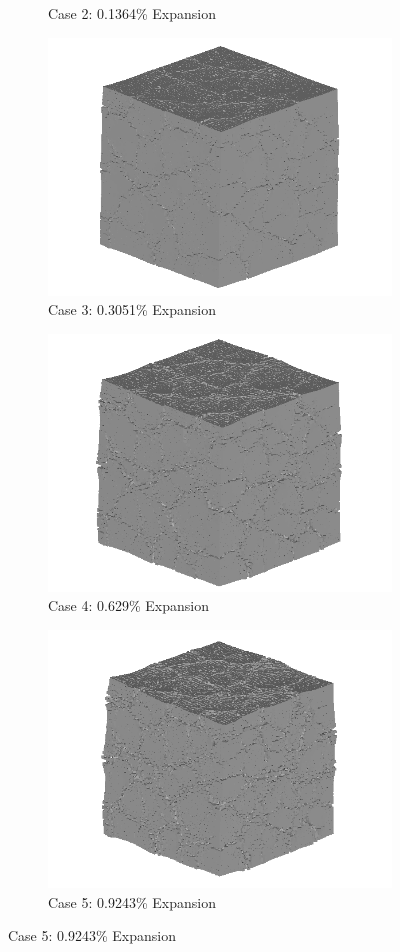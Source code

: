 \begin{figure}[!h]
\begin{subfigure}{.5\textwidth}
    \caption{Case 2: 0.1364\% Expansion}
    \end{subfigure}%
    \begin{subfigure}{.5\textwidth}
      \centering
      \includegraphics[width=.8\linewidth]{Files/exp_3D/ASR/A15P75_3_3d.png}
    \caption{Case 3: 0.3051\% Expansion}
    \end{subfigure}
    \begin{subfigure}{.5\textwidth}
      \centering
      \includegraphics[width=.8\linewidth]{Files/exp_3D/ASR/A15P75_4_3d.png}
    \caption{Case 4: 0.629\% Expansion}
    \end{subfigure}%
    \begin{subfigure}{.5\textwidth}
      \centering
      \includegraphics[width=.8\linewidth]{Files/exp_3D/ASR/A15P75_5_3d.png}
    \caption{Case 5: 0.9243\% Expansion}
    \end{subfigure}


\end{figure}
